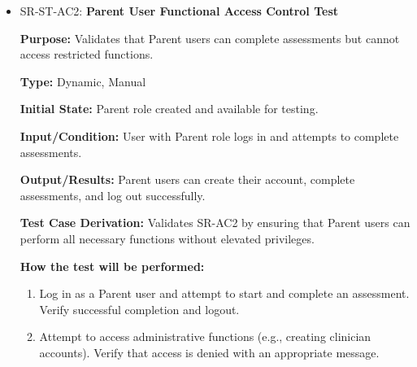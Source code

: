 \documentclass[12pt, titlepage]{article}
\begin{document}
\begin{itemize}
  \item SR-ST-AC2: \textbf{Parent User Functional Access Control Test}
  \begin{mdframed}[linewidth=0.5mm]
      \textbf{Purpose:} Validates that Parent users can complete assessments but cannot access restricted functions. \par
      \textbf{Type:} Dynamic, Manual \par
      \textbf{Initial State:} Parent role created and available for testing. \par
      \textbf{Input/Condition:} User with Parent role logs in and attempts to complete assessments. \par
      \textbf{Output/Results:} Parent users can create their account, complete assessments, and log out successfully. \par
      \textbf{Test Case Derivation:} Validates SR-AC2 by ensuring that Parent users can perform all necessary functions without elevated privileges. \par
      \textbf{How the test will be performed:}
      \begin{enumerate}[noitemsep]
        \item Log in as a Parent user and attempt to start and complete an assessment. Verify successful completion and logout.
        \item Attempt to access administrative functions (e.g., creating clinician accounts). Verify that access is denied with an appropriate message.
      \end{enumerate}
  \end{mdframed}


\end{itemize}
\end{document}
